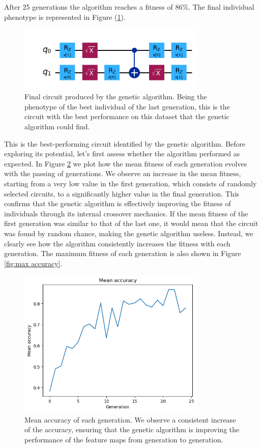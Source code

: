 \documentclass[12pt]{article}
\begin{document}
After 25 generations the algorithm reaches a fitness of 86\%. The final individual phenotype is represented in Figure (\ref{fig:final circuit}).
\begin{figure}[h!]
    \centering
    \includegraphics[width=0.8\textwidth]{images/finalcircuit.png}
    \caption{Final circuit produced by the genetic algorithm. Being the phenotype of the best individual of the last generation, this is the circuit with the best performance on this dataset that the genetic algorithm could find.}
    \label{fig:final circuit}
\end{figure}
This is the best-performing circuit identified by the genetic algorithm. Before exploring its potential, let's first assess whether the algorithm performed as expected. In Figure \ref{fig:mean accuracy} we plot how the mean fitness of each generation evolves with the passing of generations. We observe an increase in the mean fitness, starting from a very low value in the first generation, which consists of randomly selected circuits, to a significantly higher value in the final generation. This confirms that the genetic algorithm is effectively improving the fitness of individuals through its internal crossover mechanics. If the mean fitness of the first generation was similar to that of the last one, it would mean that the circuit was found by random chance, making the genetic algorithm useless. Instead, we clearly see how the algorithm consistently increases the fitness with each generation. The maximum fitness of each generation is also shown in Figure \ref{fig:max accuracy}.
\begin{figure}[h!]
    \centering
    \includegraphics[width=0.8\textwidth]{images/meanaccuracy.png}
    \caption{Mean accuracy of each generation. We observe a consistent increase of the accuracy, ensuring that the genetic algorithm is improving the performance of the feature maps from generation to generation.}
    \label{fig:mean accuracy}
\end{figure}
\end{document}
